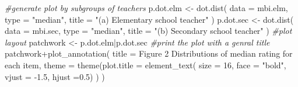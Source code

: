 \documentclass[
]{article}
\newenvironment{Shaded}{\begin{snugshade}}{\end{snugshade}}
\newcommand{\AttributeTok}[1]{\textcolor[rgb]{0.77,0.63,0.00}{#1}}
\newcommand{\CommentTok}[1]{\textcolor[rgb]{0.56,0.35,0.01}{\textit{#1}}}
\newcommand{\DecValTok}[1]{\textcolor[rgb]{0.00,0.00,0.81}{#1}}
\newcommand{\FloatTok}[1]{\textcolor[rgb]{0.00,0.00,0.81}{#1}}
\newcommand{\FunctionTok}[1]{\textcolor[rgb]{0.00,0.00,0.00}{#1}}
\newcommand{\NormalTok}[1]{#1}
\newcommand{\OtherTok}[1]{\textcolor[rgb]{0.56,0.35,0.01}{#1}}
\newcommand{\SpecialCharTok}[1]{\textcolor[rgb]{0.00,0.00,0.00}{#1}}
\newcommand{\StringTok}[1]{\textcolor[rgb]{0.31,0.60,0.02}{#1}}
\begin{document}
\begin{Shaded}
\begin{Highlighting}[]
\CommentTok{\#generate plot by subgroups of teachers}
\NormalTok{p.dot.elm }\OtherTok{\textless{}{-}} 
  \FunctionTok{dot.dist}\NormalTok{(}
    \AttributeTok{data =}\NormalTok{ mbi.elm, }
    \AttributeTok{type =} \StringTok{"median"}\NormalTok{, }
    \AttributeTok{title =} \StringTok{"(a) Elementary school teacher"}
\NormalTok{    )}
\NormalTok{p.dot.sec }\OtherTok{\textless{}{-}} 
  \FunctionTok{dot.dist}\NormalTok{(}
    \AttributeTok{data =}\NormalTok{ mbi.sec, }
    \AttributeTok{type =} \StringTok{"median"}\NormalTok{, }
    \AttributeTok{title =} \StringTok{"(b) Secondary school teacher"}
\NormalTok{    )}
\CommentTok{\#plot layout}
\NormalTok{patchwork }\OtherTok{\textless{}{-}}\NormalTok{ p.dot.elm}\SpecialCharTok{|}\NormalTok{p.dot.sec}
\CommentTok{\#print the plot with a genral title}
\NormalTok{patchwork}\SpecialCharTok{+}\FunctionTok{plot\_annotation}\NormalTok{(}
    \AttributeTok{title =} 
      \StringTok{\textquotesingle{}Figure 2 Distributions of median rating for each item\textquotesingle{}}\NormalTok{,}
    \AttributeTok{theme =} 
      \FunctionTok{theme}\NormalTok{(}\AttributeTok{plot.title =} 
              \FunctionTok{element\_text}\NormalTok{(}
                \AttributeTok{size =} \DecValTok{16}\NormalTok{,}
                \AttributeTok{face =} \StringTok{"bold"}\NormalTok{,}
                \AttributeTok{vjust =} \SpecialCharTok{{-}}\FloatTok{1.5}\NormalTok{,}
                \AttributeTok{hjust =}\FloatTok{0.5}\NormalTok{)}
\NormalTok{            )}
\NormalTok{    )}
\end{Highlighting}
\end{Shaded}
\end{document}
